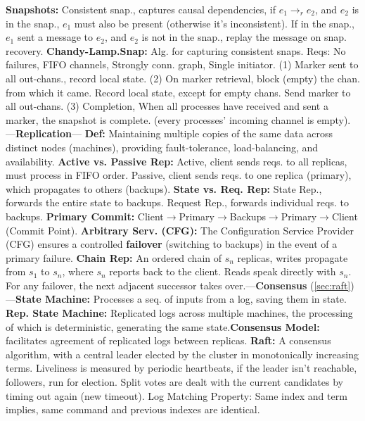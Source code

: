\newpage

\begin{multicols}{2}
    
    \noindent
    \textbf{Snapshots:} Consistent snap., captures causal dependencies, if 
    $e_1 \to_r e_2$, and $e_2$ is in the snap., $e_1$ must also be present (otherwise it's inconsistent). If in the 
    snap., $e_1$ sent a message to $e_2$, and $e_2$ is not in the snap., replay the message on snap. recovery.
    \textbf{Chandy-Lamp.Snap:} Alg. for capturing consistent snaps. Reqs: No failures, FIFO channels, Strongly conn. graph, Single initiator.
    (1) Marker sent to all out-chans., record local state. (2) On marker retrieval, block (empty) the chan. from which it came. Record local state, except for empty chans. Send marker to all out-chans.
    (3) Completion, When all processes have received and sent a marker, the snapshot is complete.
    (every processes' incoming channel is empty).---\textbf{Replication}---
    \textbf{Def:} Maintaining multiple copies of the same data across distinct nodes (machines), providing fault-tolerance, load-balancing, and availability.
    \textbf{Active vs. Passive Rep:} Active, client sends reqs. to all replicas, must process in FIFO order. Passive, client sends reqs. to one replica (primary), which propagates to others (backups).
    \textbf{State vs. Req. Rep:} State Rep., forwards the entire state to backups. Request Rep., forwards individual reqs. to backups.
    \textbf{Primary Commit:} Client$\to$Primary$\to$Backups$\to$Primary$\to$Client (Commit Point).
    \textbf{Arbitrary Serv. (CFG):} The Configuration Service Provider (CFG) ensures a controlled \textbf{failover} (switching to backups) in the event of a primary failure.
    \textbf{Chain Rep:} An ordered chain of $s_n$ replicas, writes propagate from $s_1$ to $s_n$, where $s_n$ reports back to the client. Reads speak directly with $s_n$. For any failover, the next adjacent successor takes over.---\textbf{Consensus} (\ref{sec:raft})---\textbf{State Machine:}
    Processes a seq. of inputs from a log, saving them in state. \textbf{Rep. State Machine:} Replicated logs across multiple machines, the processing of 
    which is deterministic, generating the same state.\textbf{Consensus Model:} facilitates agreement of replicated logs between replicas.
    \textbf{Raft:} A consensus algorithm, with a central leader elected by the cluster in monotonically increasing terms. Liveliness is measured by periodic heartbeats, if the leader
    isn't reachable, followers, run for election. Split votes are dealt with the current candidates by timing out again (new timeout). Log Matching Property: Same index and term implies, same command and previous indexes are identical.

\end{multicols}
